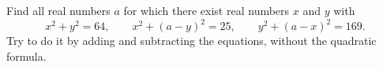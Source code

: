 Find all real numbers $a$ for which there exist real numbers $x$ and $y$ with
\[x^2+y^2=64,\qquad x^2+(a-y)^2=25,\qquad y^2+(a-x)^2=169.\]
Try to do it by adding and subtracting the equations, without the quadratic formula.
